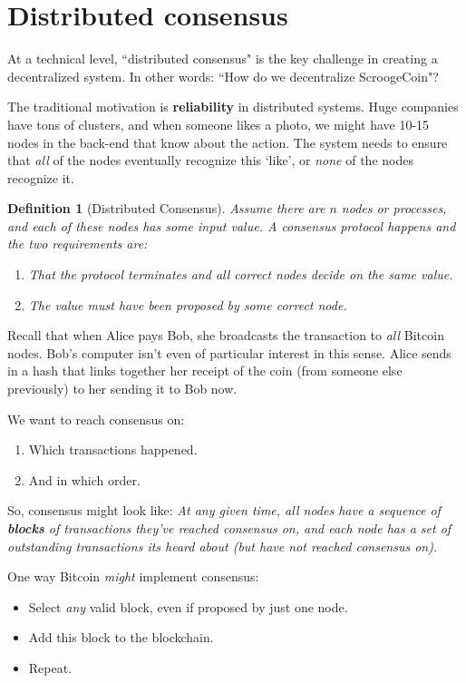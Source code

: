 \documentclass[12pt]{article}
\newtheorem*{mydef}{Definition}
\begin{document}
\section*{Distributed consensus}

At a technical level, ``distributed consensus" is the key challenge in creating a decentralized system. In other words: ``How do we decentralize ScroogeCoin"?

The traditional motivation is \textbf{reliability} in distributed systems. Huge companies have tons of clusters, and when someone likes a photo, we might have 10-15 nodes in the back-end that know about the action. The system needs to ensure that \textit{all} of the nodes eventually recognize this `like', or \textit{none} of the nodes recognize it.

\begin{mydef}[Distributed Consensus]
Assume there are $n$ nodes or processes, and each of these nodes has some input value. A consensus protocol happens and the two requirements are:
\begin{enumerate}
\item That the protocol terminates and all correct nodes decide on the same value.
\item The value must have been proposed by \textit{some} correct node.
\end{enumerate}
\end{mydef}

Recall that when Alice pays Bob, she broadcasts the transaction to \textit{all} Bitcoin nodes. Bob's computer isn't even of particular interest in this sense. Alice sends in a  hash that links together her receipt of the coin (from someone else previously) to her sending it to Bob now.

We want to reach consensus on:
\begin{enumerate}
\item Which transactions happened.
\item And in which order.
\end{enumerate}

So, consensus might look like: \textit{At any given time, all nodes have a sequence of \textbf{blocks} of transactions they've reached consensus on, and each node has a set of outstanding transactions its heard about (but have not reached consensus on).}

One way Bitcoin \textit{might} implement consensus:
\begin{itemize}
\item Select \textit{any} valid block, even if proposed by just one node.
\item Add this block to the blockchain.
\item Repeat.
\end{itemize}
\end{document}
